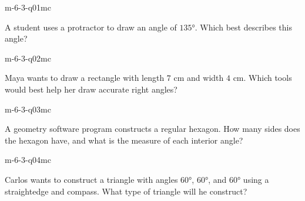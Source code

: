 

\begin{practiceQuestion}{m-6-3-q01}{mc}
\begin{questionText}
A student uses a protractor to draw an angle of $135°$. Which best describes this angle?
\end{questionText}
\end{practiceQuestion}

\begin{practiceQuestion}{m-6-3-q02}{mc}
\begin{questionText}
Maya wants to draw a rectangle with length $7$ cm and width $4$ cm. Which tools would best help her draw accurate right angles?
\end{questionText}
\end{practiceQuestion}

\begin{practiceQuestion}{m-6-3-q03}{mc}
\begin{questionText}
A geometry software program constructs a regular hexagon. How many sides does the hexagon have, and what is the measure of each interior angle?
\end{questionText}
\end{practiceQuestion}

\begin{practiceQuestion}{m-6-3-q04}{mc}
\begin{questionText}
Carlos wants to construct a triangle with angles $60°$, $60°$, and $60°$ using a straightedge and compass. What type of triangle will he construct?
\end{questionText}
\end{practiceQuestion}

